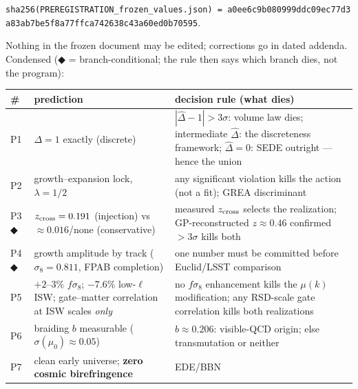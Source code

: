 \documentclass[submission, Phys]{SciPost}
\begin{document}
\texttt{sha256(PREREGISTRATION\_frozen\_values.json)\ =\ a0ee6c9b080999ddc09ec77d3a83ab7be5f8a77ffca742638c43a60ed0b70595}.

Nothing in the frozen document may be edited; corrections go in dated
addenda. Condensed (◆ = branch-conditional; the rule then says which
branch dies, not the program):

\begin{longtable}[]{@{}
  >{\raggedright\arraybackslash}p{}
  >{\raggedright\arraybackslash}p{}
  >{\raggedright\arraybackslash}p{}@{}}
\toprule\noalign{}
\begin{minipage}[b]{\linewidth}\raggedright
\#
\end{minipage} & \begin{minipage}[b]{\linewidth}\raggedright
prediction
\end{minipage} & \begin{minipage}[b]{\linewidth}\raggedright
decision rule (what dies)
\end{minipage} \\
\midrule\noalign{}
\endhead
\bottomrule\noalign{}
\endlastfoot
P1 & \(\Delta = 1\) exactly (discrete) & \(|\hat\Delta - 1| > 3\sigma\):
volume law dies; intermediate \(\hat\Delta\): the discreteness
framework; \(\hat\Delta = 0\): SEDE outright --- hence the union \\
P2 & growth--expansion lock, \(\lambda = 1/2\) & any significant
violation kills the action (not a fit); GREA discriminant \\
P3 ◆ & \(z_{\rm cross} = 0.191\) (injection) vs \(\approx 0.016\)/none
(conservative) & measured \(z_{\rm cross}\) selects the realization;
GP-reconstructed \(z\approx 0.46\) confirmed \(>3\sigma\) kills both \\
P4 ◆ & growth amplitude by track (\(\sigma_8 = 0.811\), FPAB completion)
& one number must be committed before Euclid/LSST comparison \\
P5 & \(+2\)--\(3\%\) \(f\sigma_8\); \(-7.6\%\) low-\(\ell\) ISW;
gate--matter correlation at ISW scales \emph{only} & no \(f\sigma_8\)
enhancement kills the \(\mu(k)\) modification; any RSD-scale gate
correlation kills both realizations \\
P6 & braiding \(b\) measurable (\(\sigma(\mu_0)\approx 0.05\)) &
\(b\approx 0.206\): visible-QCD origin; else transmutation or neither \\
P7 & clean early universe; \textbf{zero cosmic birefringence} & EDE/BBN

\end{longtable}
\end{document}
